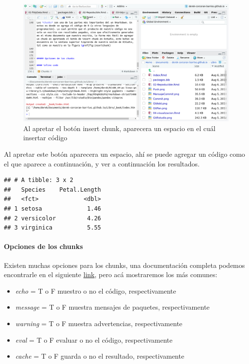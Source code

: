 \documentclass[]{book}
\newenvironment{Shaded}{\begin{snugshade}}{\end{snugshade}}
\newcommand{\NormalTok}[1]{#1}
\providecommand{\tightlist}{%
  \setlength{\itemsep}{0pt}\setlength{\parskip}{0pt}}
\let\oldparagraph\paragraph
\renewcommand{\paragraph}[1]{\oldparagraph{#1}\mbox{}}
\begin{document}
\begin{figure}

{\centering \includegraphics[width=0.8\linewidth]{Insertchunk} 

}

\caption{Al apretar el botón insert chunk, aparecera un espacio en el cuál insertar código}\label{fig:Insertchunk}
\end{figure}

Al apretar este botón aparecera un espacio, ahí se puede agregar un
código como el que aparece a continuación, y ver a continuación los
resultados.

\begin{Shaded}
\end{Shaded}

\begin{verbatim}
## # A tibble: 3 x 2
##   Species    Petal.Length
##   <fct>             <dbl>
## 1 setosa             1.46
## 2 versicolor         4.26
## 3 virginica          5.55
\end{verbatim}

\hypertarget{opciones-de-los-chunks}{%
\paragraph{Opciones de los chunks}\label{opciones-de-los-chunks}}

Existen muchas opciones para los chunks, una documentación completa
podemos encontrarle en el siguiente
\href{https://yihui.name/knitr/options/}{link}, pero acá mostraremos los
más comunes:

\begin{itemize}
\tightlist
\item
  \emph{echo} = T o F muestro o no el código, respectivamente
\item
  \emph{message} = T o F muestra mensajes de paquetes, respectivamente
\item
  \emph{warning} = T o F muestra advertencias, respectivamente
\item
  \emph{eval} = T o F evaluar o no el código, respectivamente
\item
  \emph{cache} = T o F guarda o no el resultado, respectivamente
\end{itemize}
\end{document}
